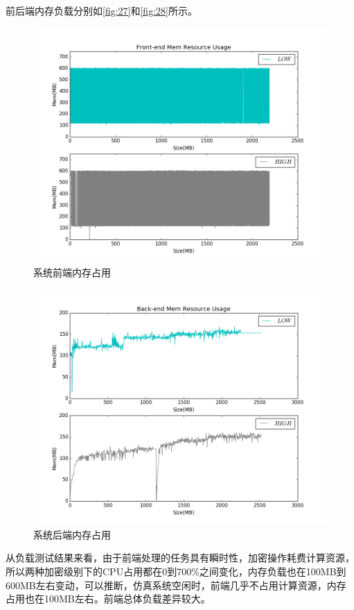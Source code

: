 前后端内存负载分别如\autoref{fig:27}和\autoref{fig:28}所示。
\begin{figure}[H]
	\centering
	\includegraphics[width=1\textwidth]{Pics/figure_mem_client.png}
	\caption{系统前端内存占用}
	\label{fig:27}
\end{figure}
\begin{figure}[H]
	\centering
	\includegraphics[width=1\textwidth]{Pics/figure_mem_server.png}
	\caption{系统后端内存占用}
	\label{fig:28}
\end{figure}
从负载测试结果来看，由于前端处理的任务具有瞬时性，加密操作耗费计算资源，所以两种加密级别下的CPU占用都在0到700\%之间变化，内存负载也在100MB到600MB左右变动，可以推断，仿真系统空闲时，前端几乎不占用计算资源，内存占用也在100MB左右。前端总体负载差异较大。


